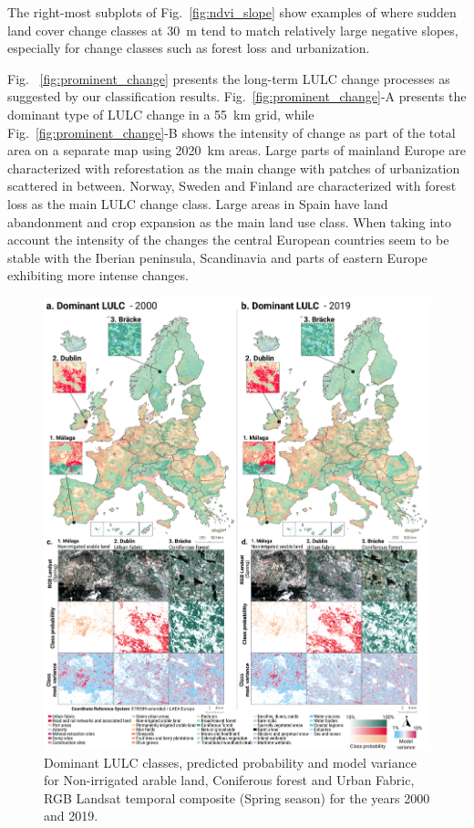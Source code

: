      The right-most subplots of Fig.\@~\ref{fig:ndvi_slope} show examples of where sudden land cover change classes at 30~m tend to match relatively large negative slopes, especially for change classes such as forest loss and urbanization.
    
    Fig. \@~\ref{fig:prominent_change} presents the long-term LULC change processes as suggested by our classification results. Fig.\@~\ref{fig:prominent_change}-A presents the dominant type of LULC change in a 5{\texttimes}5~km grid, while Fig.\@~\ref{fig:prominent_change}-B shows the intensity of change as part of the total area on a separate map using 20{\texttimes}20~km areas. Large parts of mainland Europe are characterized with reforestation as the main change with patches of urbanization scattered in between. Norway, Sweden and Finland are characterized with forest loss as the main LULC change class. Large areas in Spain have land abandonment and crop expansion as the main land use class. 
    When taking into account the intensity of the changes the central European countries seem to be stable with the Iberian peninsula, Scandinavia and parts of eastern Europe exhibiting more intense changes.
    
    \begin{figure}[!hp]
    \includegraphics[width=1\textwidth]{figs_03/results_landcover.png}
    \caption{Dominant LULC classes, predicted probability and model variance for Non-irrigated arable land, Coniferous forest and Urban Fabric, RGB Landsat temporal composite (Spring season) for the years 2000 and 2019.}
    \label{fig:landcover}
    \end{figure}
    
